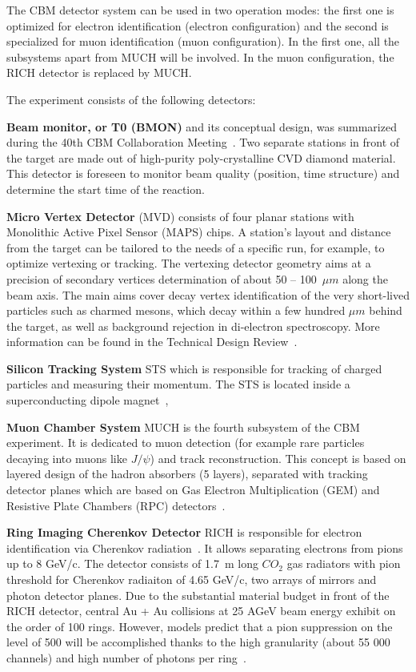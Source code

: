 The CBM detector system can be used in two operation modes: the first one is optimized for electron identification (electron configuration) and the second is specialized for muon identification (muon configuration). In the first one, all the subsystems apart from MUCH will be involved. In the muon configuration, the \gls{RICH} detector is replaced by \gls{MUCH}.



The experiment consists of the following detectors:

\textbf{Beam monitor, or T0 (\gls{BMON})} and its conceptual design, was summarized during the 40th \gls{CBM} Collaboration Meeting~\cite{bmon}. Two separate stations in front of the target are made out of high-purity poly-crystalline CVD diamond material. This detector is foreseen to monitor beam quality (position, time structure) and determine the start time of the reaction.

\textbf{Micro Vertex Detector} (\gls{MVD}) consists of four planar stations with Monolithic Active Pixel Sensor (\gls{MAPS}) chips. A station's layout and distance from the target can be tailored to the needs of a specific run, for example, to optimize vertexing or tracking. The vertexing detector geometry aims at a precision of secondary vertices determination of about 50 -- 100~$\mu m$ along the beam axis. The main aims cover decay vertex identification of the very short-lived particles such as charmed mesons, which decay within a few hundred $\mu m$ behind the target, as well as background rejection in di-electron spectroscopy. More information can be found in the Technical Design Review~\cite{MVD}.

 \textbf{Silicon Tracking System} \gls{STS} which is responsible for tracking of charged particles and measuring their momentum. The \gls{STS} is located inside a superconducting dipole magnet~\cite{Malakhov:109025},
 
\textbf{Muon Chamber System} \gls{MUCH} is the fourth subsystem of the \gls{CBM} experiment. It is dedicated to muon detection (for example rare particles decaying into muons like $J/\psi$) and track reconstruction. This concept is based on layered design of the hadron absorbers (5 layers), separated with tracking detector planes which are based on Gas Electron Multiplication (\gls{GEM}) and Resistive Plate Chambers (\gls{RPC}) detectors~\cite{MUCH}.

\textbf{Ring Imaging Cherenkov Detector} \gls{RICH} is responsible for electron identification via Cherenkov radiation~\cite{RICH}. It allows separating electrons from pions up to 8 GeV/c. The detector consists of \SI{1.7}{\metre} long $CO_{2}$ gas radiators with pion threshold for Cherenkov radiaiton of 4.65 GeV/c, two arrays of mirrors and photon detector planes. Due to the substantial material budget in front of the RICH detector, central Au + Au collisions at 25 AGeV beam energy exhibit on the order of 100 rings. However, models predict that a pion suppression on the level of 500 will be accomplished thanks to the high granularity (about 55 000 channels) and high number of photons per ring~\cite{RICH}.

